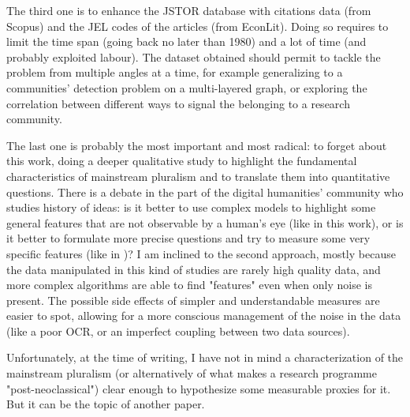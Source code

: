 \documentclass[a4paper, 11pt, headings=standardclasses, tablecaptionsbelow]{scrartcl}
\begin{document}
The third one is to enhance the JSTOR database with citations data (from Scopus) and the JEL codes of the articles (from EconLit). Doing so requires to limit the time span (going back no later than 1980) and a lot of time (and probably exploited labour).
The dataset obtained should permit to tackle the problem from multiple angles at a time, for example generalizing to a communities' detection problem on a multi-layered graph, or exploring the correlation between different ways to signal the belonging to a research community.

The last one is probably the most important and most radical: to forget about this work, doing a deeper qualitative study to highlight the fundamental characteristics of mainstream pluralism and to translate them into quantitative questions.
There is a debate in the part of the digital humanities' community who studies history of ideas: is it better to use complex models to highlight some general features that are not observable by a human's eye (like in this work), or is it better to formulate more precise questions and try to measure some very specific features (like in \textcite{babbiotti2022})?
I am inclined to the second approach, mostly because the data manipulated in this kind of studies are rarely high quality data, and more complex algorithms are able to find "features" even when only noise is present. The possible side effects of simpler and understandable measures are easier to spot, allowing for a more conscious management of the noise in the data (like a poor OCR, or an imperfect coupling between two data sources).

Unfortunately, at the time of writing, I have not in mind a characterization of the mainstream pluralism (or alternatively of what makes a research programme "post-neoclassical"\parencite{Redigonda2023}) clear enough to hypothesize some measurable proxies for it. But it can be the topic of another paper.

\clearpage
\begin{refcontext}[sorting=nyt]
  \printbibliography
\end{refcontext}
\clearpage
\end{document}
